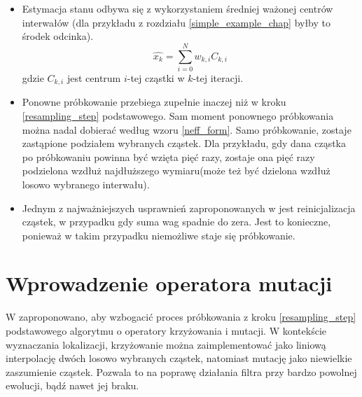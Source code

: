 \begin{itemize}
	\item Estymacja stanu odbywa się z wykorzystaniem średniej ważonej centrów interwałów (dla przykładu z rozdziału \ref{simple_example_chap} byłby to środek odcinka).
	\begin{equation}
		\hat{x_k} = \sum_{i=0}^{N} w_{k,i} C_{k,i}
	\end{equation}
	gdzie $C_{k,i}$ jest centrum $i$-tej cząstki w $k$-tej iteracji.
	\item Ponowne próbkowanie przebiega zupełnie inaczej niż w kroku \ref{resampling_step} podstawowego. Sam moment ponownego próbkowania można nadal dobierać według wzoru \ref{neff_form}. Samo próbkowanie, zostaje zastąpione podziałem wybranych cząstek. Dla przykładu, gdy dana cząstka po próbkowaniu powinna być wzięta pięć razy, zostaje ona pięć razy podzielona wzdłuż najdłuższego wymiaru(może też być dzielona wzdłuż losowo wybranego interwału).
	\item Jednym z najważniejszych usprawnień zaproponowanych w \cite{brbpf} jest reinicjalizacja cząstek, w przypadku gdy suma wag spadnie do zera. Jest to konieczne, ponieważ w takim przypadku niemożliwe staje się próbkowanie.
\end{itemize}

\section{Wprowadzenie operatora mutacji}
W \cite{pfgen} zaproponowano, aby wzbogacić proces próbkowania z kroku \ref{resampling_step} podstawowego algorytmu o operatory krzyżowania i mutacji. W kontekście wyznaczania lokalizacji, krzyżowanie można zaimplementować jako liniową interpolację dwóch losowo wybranych cząstek, natomiast mutację jako niewielkie zaszumienie cząstek. Pozwala to na poprawę działania filtra przy bardzo powolnej ewolucji, bądź nawet jej braku.
